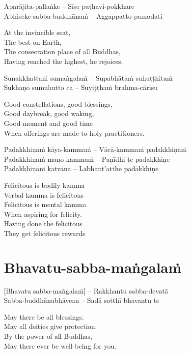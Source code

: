 Aparājita-pallaṅke – Sīse paṭhavi-pokkhare\\
Abhiseke sabba-buddhānaṁ – Aggappatto pamodati

\begin{english}
  At the invincible seat,\\
  The best on Earth,\\
  The consecration place of all Buddhas,\\
  Having reached the highest, he rejoices.
\end{english}

\suttaRef{[MJG]}

Sunakkhattaṁ sumaṅgalaṁ – Supabhātaṁ suhuṭṭhitaṁ\\
Sukhaṇo sumuhutto ca – Suyiṭṭhaṁ brahma-cārisu

\begin{english}
  Good constellations, good blessings,\\
  Good daybreak, good waking,\\
  Good moment and good time\\
  When offerings are made to holy practitioners.
\end{english}

Padakkhiṇaṁ kāya-kammaṁ – Vācā-kammaṁ padakkhiṇaṁ\\
Padakkhiṇaṁ mano-kammaṁ – Paṇīdhi te padakkhiṇe\\
Padakkhiṇāni katvāna – Labhant'atthe padakkhiṇe

\begin{english}
  Felicitous is bodily kamma\\
  Verbal kamma is felicitous\\
  Felicitous is mental kamma\\
  When aspiring for felicity.\\
  Having done the felicitous\\
  They get felicitous rewards
\end{english}

\suttaRef{[AN 3.155]}

\section{Bhavatu-sabba-maṅgalaṁ}
\label{bhavatu-sabba-mangalam}
[Bhavatu sabba-maṅgalaṁ] – Rakkhantu sabba-devatā\\
Sabba-buddhānubhāvena – Sadā sotthī bhavantu te

\begin{english}
  May there be all blessings.\\
  May all deities give protection.\\
  By the power of all Buddhas,\\
  May there ever be well-being for you.
\end{english}

